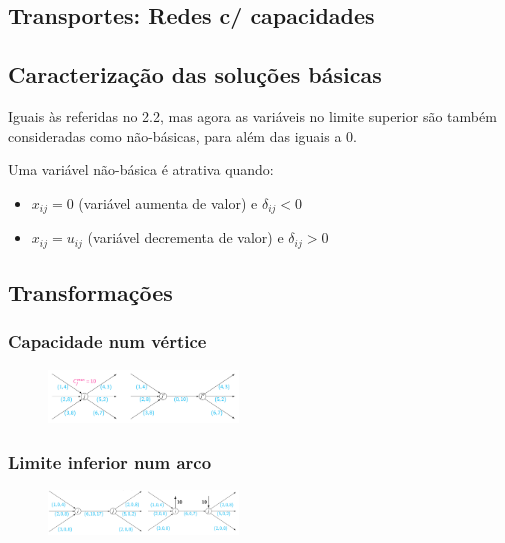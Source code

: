 \documentclass[10pt, a4paper]{article}
\begin{document}
\begin{multicols}{2}



\section{Transportes: Redes c/ capacidades}

\subsection{Caracterização das soluções básicas}

Iguais às referidas no 2.2, mas agora as variáveis no limite superior são também consideradas como não-básicas, para além das iguais a 0.

Uma variável não-básica é atrativa quando:
\begin{itemize}
    \item \(x_{ij} = 0\) (variável aumenta de valor) e \(\delta_{ij} < 0\)
    \item \(x_{ij} = u_{ij}\) (variável decrementa de valor) e \(\delta_{ij} > 0\)
\end{itemize}

\subsection{Transformações}

\subsubsection{Capacidade num vértice}

\begin{figure}[H]
    \centering
    \includegraphics[width=0.45\textwidth]{cap_vertice.png}
\end{figure}

\subsubsection{Limite inferior num arco}

\begin{figure}[H]
    \centering
    \includegraphics[width=0.45\textwidth]{limites.png}
\end{figure}




\end{multicols}
\end{document}
